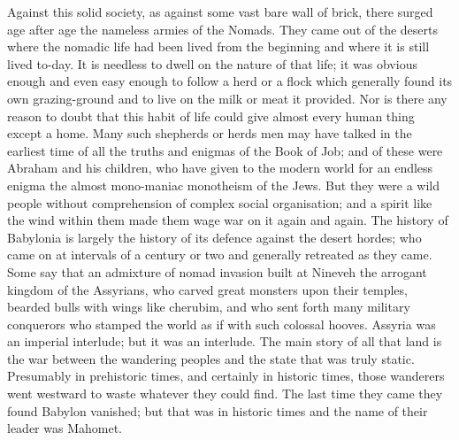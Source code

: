 Against this solid society, as against some vast bare wall of brick, there surged age after age the nameless armies of the Nomads. They came out of the deserts where the nomadic life had been lived from the beginning and where it is still lived to-day. It is needless to dwell on the nature of that life; it was obvious enough and even easy enough to follow a herd or a flock which generally found its own grazing-ground and to live on the milk or meat it provided. Nor is there any reason to doubt that this habit of life could give almost every human thing except a home. Many such shepherds or herds men may have talked in the earliest time of all the truths and enigmas of the Book of Job; and of these were Abraham and his children, who have given to the modern world for an endless enigma the almost mono-maniac monotheism of the Jews. But they were a wild people without comprehension of complex social organisation; and a spirit like the wind within them made them wage war on it again and again. The history of Babylonia is largely the history of its defence against the desert hordes; who came on at intervals of a century or two and generally retreated as they came. Some say that an admixture of nomad invasion built at Nineveh the arrogant kingdom of the Assyrians, who carved great monsters upon their temples, bearded bulls with wings like cherubim, and who sent forth many military conquerors who stamped the world as if with such colossal hooves. Assyria was an imperial interlude; but it was an interlude. The main story of all that land is the war between the wandering peoples and the state that was truly static. Presumably in prehistoric times, and certainly in historic times, those wanderers went westward to waste whatever they could find. The last time they came they found Babylon vanished; but that was in historic times and the name of their leader was Mahomet.

